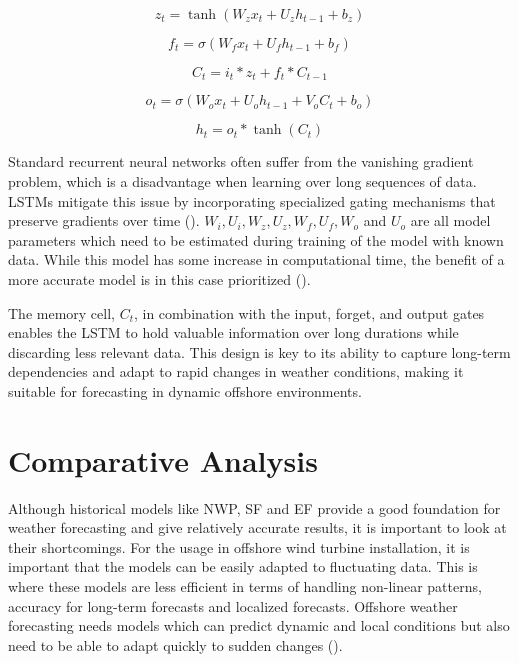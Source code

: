 \begin{equation}
    z_t = \tanh(W_z x_t + U_z h_{t-1} + b_z)
    \label{eq:4}
\end{equation}

\begin{equation}
    f_t = \sigma(W_f x_t + U_f h_{t-1} + b_f)
    \label{eq:5}
\end{equation}

\begin{equation}
    C_t = i_t * z_t + f_t * C_{t-1}
    \label{eq:6}
\end{equation}

\begin{equation}
    o_t = \sigma(W_o x_t + U_o h_{t-1} + V_o C_t + b_o)
    \label{eq:7}
\end{equation}

\begin{equation}
    h_t = o_t * \tanh(C_t)
    \label{eq:8}
\end{equation}

\noindent Standard recurrent neural networks often suffer from the vanishing gradient problem, which is a disadvantage when learning over long sequences of data. LSTMs mitigate this issue by incorporating specialized gating mechanisms that preserve gradients over time (\cite{hochreiter1997long}). $W_i, U_i, W_z, U_z, W_f, U_f, W_o$ and $U_o$ are all model parameters which need to be estimated during training of the model with known data. While this model has some increase in computational time, the benefit of a more accurate model is in this case prioritized (\cite{salman2018single}). 

\vspace{0.25cm}

\noindent The memory cell, $C_t$, in combination with the input, forget, and output gates enables the LSTM to hold valuable information over long durations while discarding less relevant data. This design is key to its ability to capture long-term dependencies and adapt to rapid changes in weather conditions, making it suitable for forecasting in dynamic offshore environments.

\section{Comparative Analysis}
\label{lit:comparative}
Although historical models like NWP, SF and EF provide a good foundation for weather forecasting and give relatively accurate results, it is important to look at their shortcomings. For the usage in offshore wind turbine installation, it is important that the models can be easily adapted to fluctuating data. This is where these models are less efficient in terms of handling non-linear patterns, accuracy for long-term forecasts and localized forecasts. Offshore weather forecasting needs models which can predict dynamic and local conditions but also need to be able to adapt quickly to sudden changes (\cite{Zhang2019}).

